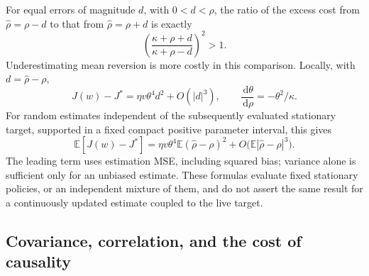 \documentclass[11pt]{article}
\theoremstyle{plain}
\theoremstyle{definition}
\theoremstyle{remark}
\newcommand{\E}{\mathbb E}
\newcommand{\dd}{\,\mathrm d}
\begin{document}
For equal errors of magnitude \(d\), with \(0<d<\rho\), the ratio
of the excess cost from \(\widehat\rho=\rho-d\) to that from
\(\widehat\rho=\rho+d\) is exactly
\[
\left(\frac{\kappa+\rho+d}{\kappa+\rho-d}\right)^2>1.
\]
Underestimating mean reversion is more costly in this comparison.
Locally, with \(d=\widehat\rho-\rho\),
\[
J(w)-J^\ast=\eta v\theta^4d^2+O(|d|^3),
\qquad \frac{\dd\theta}{\dd\rho}=-\theta^2/\kappa.
\]
For random estimates independent of the subsequently evaluated
stationary target, supported in a fixed compact positive parameter
interval, this gives
\[
\E[J(w)-J^\ast]
=\eta v\theta^4\E(\widehat\rho-\rho)^2
  +O\big(\E|\widehat\rho-\rho|^3\big).
\]
The leading term uses estimation MSE, including squared bias;
variance alone is sufficient only for an unbiased estimate. These
formulas evaluate fixed stationary policies, or an independent mixture
of them, and do not assert the same result for a continuously updated
estimate coupled to the live target.

\subsection{Covariance, correlation, and the cost of causality}
\end{document}
